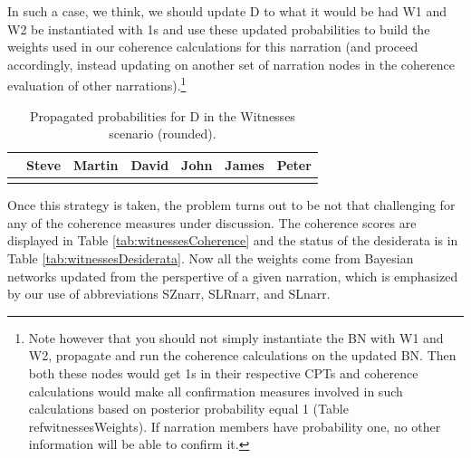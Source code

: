 \documentclass[
  10pt,
]{scrartcl}
\begin{document}
In such a case, we think, we should update \textsf{D} to what it would be had \textsf{W1} and \textsf{W2} be instantiated with 1s and use these updated probabilities to build the weights used in our coherence calculations for this narration (and proceed accordingly, instead updating on another set of narration nodes in the coherence evaluation of other narrations).\footnote{Note  however that  you should not simply instantiate the BN with \textsf{W1} and \textsf{W2}, propagate and run the coherence calculations on the updated BN. Then both these nodes would get 1s in their respective CPTs and coherence calculations would make   all  confirmation measures involved in such calculations  based on posterior probability equal 1 (Table \\ref{witnessesWeights}). If narration members have probability one, no other information will be able to confirm it.}

\begin{table}[H]

\caption{\label{tab:witnessesWeights}Propagated probabilities for D in the Witnesses scenario (rounded).}
\centering
\begin{tabular}[t]{lrrrrrr}
\toprule
  & Steve & Martin & David & John & James & Peter\\
\midrule
\cellcolor{gray!6}{Pr} & \cellcolor{gray!6}{0.981} & \cellcolor{gray!6}{0.004} & \cellcolor{gray!6}{0.004} & \cellcolor{gray!6}{0.004} & \cellcolor{gray!6}{0.004} & \cellcolor{gray!6}{0.004}\\
\bottomrule
\end{tabular}
\end{table}

Once this strategy is taken, the problem turns out to be not that challenging for any of the coherence measures under discussion. The coherence scores are displayed in Table \ref{tab:witnessesCoherence} and the status of the desiderata is in Table \ref{tab:witnessesDesiderata}. Now all the weights come from Bayesian networks updated from the perspertive of a given narration, which is emphasized by our use of abbreviations SZnarr, SLRnarr, and SLnarr.
\end{document}
